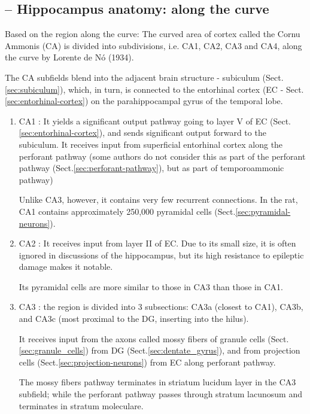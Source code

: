 \subsection{-- Hippocampus anatomy: along the curve}

Based on the region along the curve: The curved area of cortex
called the Cornu Ammonis (CA) is divided into subdivisions, i.e. CA1, CA2, CA3
and CA4, along the curve by Lorente de N\'{o} (1934). 

The CA subfields blend into the adjacent brain structure - subiculum
(Sect.\ref{sec:subiculum}), which, in turn, is connected to the entorhinal
cortex (EC - Sect.\ref{sec:entorhinal-cortex})  on the parahippocampal gyrus of
the temporal lobe.
\begin{enumerate}
  \item CA1 : It yields a significant output pathway going to layer V of EC
  (Sect.\ref{sec:entorhinal-cortex}), and sends significant output forward to
  the subiculum. It receives input from superficial entorhinal cortex along the
  perforant pathway (some authors do not consider this as part of the perforant
  pathway (Sect.\ref{sec:perforant-pathway}), but as part of temporoammonic
  pathway)
  
   Unlike CA3, however, it contains very few recurrent connections.
   In the rat, CA1 contains approximately 250,000 pyramidal cells
   (Sect.\ref{sec:pyramidal-neurons}).
   
  \item CA2 : It receives input from layer II of EC.
  Due to its small size, it is often ignored in discussions of the hippocampus,
  but its high resistance to epileptic damage makes it notable.
  
  Its pyramidal cells are more similar to those in CA3 than those in CA1.
  
  \item CA3 : the region is divided into 3 subsections: CA3a (closest to CA1),
  CA3b, and CA3c (most proximal to the DG, inserting into the hilus).
  
  It receives input from the axons called mossy fibers of granule cells
  (Sect.\ref{sec:granule_cells}) from DG (Sect.\ref{sec:dentate_gyrus}), and
  from projection cells (Sect.\ref{sec:projection-neurons}) from EC along
  perforant pathway.
  
  The mossy fibers pathway terminates in striatum lucidum layer in the CA3
  subfield; while the perforant pathway passes through stratum lacunosum and
  terminates in stratum moleculare.
  

\end{enumerate}
